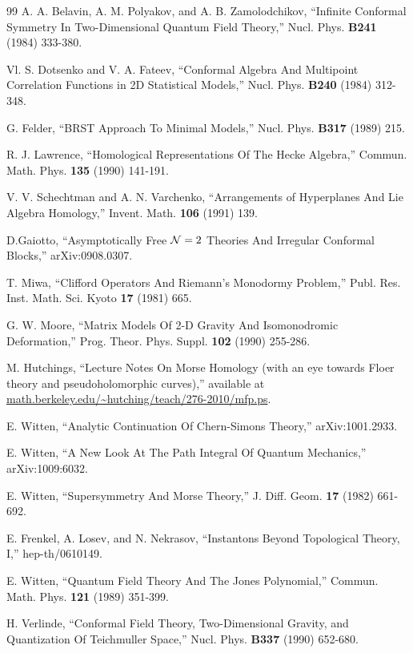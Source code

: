\begin{thebibliography}{99}
A. A. Belavin,
A. M. Polyakov, and A. B. Zamolodchikov, ``Infinite Conformal Symmetry In Two-Dimensional
Quantum Field Theory,'' Nucl. Phys. {\bf B241} (1984) 333-380.

Vl. S. Dotsenko and V. A. Fateev, ``Conformal Algebra And Multipoint Correlation Functions in 2D Statistical Models,''
Nucl. Phys. {\bf B240}  (1984) 312-348.

G. Felder, ``BRST Approach To Minimal Models,''  Nucl. Phys. {\bf B317} (1989) 215.

R. J. Lawrence, ``Homological Representations Of The Hecke Algebra,'' Commun.
Math. Phys. {\bf 135} (1990) 141-191.

V. V. Schechtman and A. N. Varchenko, ``Arrangements of Hyperplanes And Lie Algebra
Homology,'' Invent. Math. {\bf 106}
(1991) 139.

D.Gaiotto,  ``Asymptotically Free ${\mathcal N}=2$ Theories And Irregular Conformal Blocks,''
arXiv:0908.0307.

T. Miwa, ``Clifford Operators And Riemann's Monodormy Problem,'' Publ. Res. Inst. Math.
Sci. Kyoto {\bf 17} (1981) 665.

G. W. Moore, ``Matrix Models Of 2-D Gravity And Isomonodromic Deformation,'' Prog. Theor.
Phys. Suppl. {\bf 102} (1990) 255-286.

M. Hutchings, ``Lecture Notes On Morse Homology (with an eye towards Floer theory and pseudoholomorphic curves),''
available at \url{math.berkeley.edu/~hutching/teach/276-2010/mfp.ps}.

E. Witten, ``Analytic Continuation Of Chern-Simons Theory,'' arXiv:1001.2933.

E. Witten, ``A New Look At The Path Integral Of Quantum Mechanics,''
arXiv:1009:6032.

E. Witten, ``Supersymmetry And Morse Theory,''  J. Diff. Geom. {\bf 17} (1982) 661-692.

E. Frenkel, A. Losev, and N. Nekrasov, ``Instantons Beyond Topological Theory, I,''
hep-th/0610149.

E. Witten, ``Quantum Field Theory And The Jones Polynomial,'' Commun. Math. Phys. {\bf 121}
(1989) 351-399.

H. Verlinde, ``Conformal Field Theory, Two-Dimensional Gravity, and Quantization Of Teichmuller
Space,'' Nucl. Phys. {\bf B337} (1990) 652-680.


\end{thebibliography}
